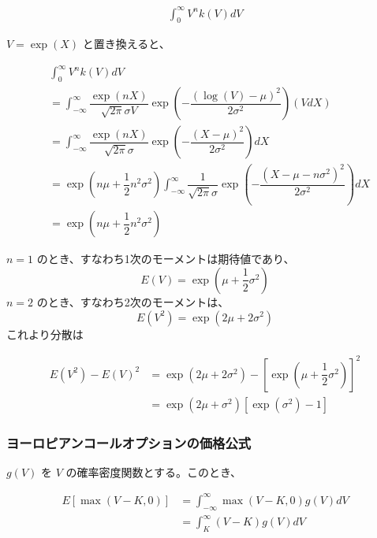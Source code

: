 \documentclass[uplatex]{jsarticle}
\begin{document}
\begin{align}
	\int^{\infty}_{0} V^{n} k(V) dV
\end{align}

$V = \exp(X)$ と置き換えると、

\begin{align}
	 & \int^{\infty}_{0} V^{n} k(V) dV                                                                                                                                                  \\
	 & = \int^{\infty}_{-\infty} \dfrac{\exp(nX)}{\sqrt{2 \pi} \sigma V} \exp \left( - \dfrac{(\log{(V)}- \mu )^{2}}{2 \sigma^{2}} \right) (VdX)                                        \\
	 & = \int^{\infty}_{-\infty} \dfrac{\exp(nX)}{\sqrt{2 \pi} \sigma} \exp \left( - \dfrac{(X- \mu )^{2}}{2 \sigma^{2}} \right) dX                                                     \\
	 & = \exp(n \mu + \dfrac{1}{2} n^{2} \sigma^{2} ) \int^{\infty}_{-\infty} \dfrac{1}{\sqrt{2 \pi} \sigma } \exp \left( - \dfrac{(X- \mu -n \sigma^{2})^{2}}{2 \sigma^{2}} \right) dX \\
	 & = \exp(n \mu + \dfrac{1}{2} n^{2} \sigma^{2} )
\end{align}

$n=1$ のとき、すなわち1次のモーメントは期待値であり、
$$
	E(V) = \exp(\mu + \dfrac{1}{2} \sigma^{2} )
$$
$n=2$ のとき、すなわち2次のモーメントは、
$$
	E(V^{2}) = \exp(2\mu + 2 \sigma^{2} )
$$
これより分散は

\begin{align}
	E(V^{2}) - E(V)^{2} & = \exp(2\mu + 2 \sigma^{2} ) - \left[ \exp(\mu + \dfrac{1}{2} \sigma^{2} ) \right]^{2} \\
	                    & = \exp(2 \mu + \sigma^{2} ) \left[ \exp( \sigma^{2}) -1 \right]
\end{align}


\subsubsection{ヨーロピアンコールオプションの価格公式}

$g(V)$ を $V$ の確率密度関数とする。このとき、

\begin{align}
	E \left[ \max(V-K,0) \right] & = \int^{\infty}_{-\infty} \max(V-K,0) g(V) dV \\
	                             & = \int^{\infty}_{K} (V-K) g(V) dV
\end{align}
\end{document}
